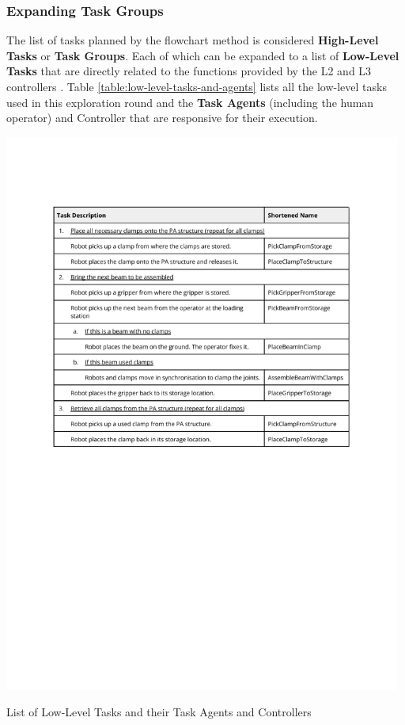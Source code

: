 \FloatBarrier

\subsubsection{Expanding Task Groups}
\label{subsubsection:exploration-3-expanding-task-groups}

The list of tasks planned by the flowchart method is considered \textbf{High-Level Tasks }or \textbf{Task Groups}. Each of which can be expanded to a list of \textbf{Low-Level Tasks} that are directly related to the functions provided by the L2 and L3 controllers . Table \ref{table:low-level-tasks-and-agents} lists all the low-level tasks used in this exploration round and the \textbf{Task Agents }(including the human operator) and Controller that are responsive for their execution.

\begin{table}[!h]
    \includegraphics[page=3, trim=25.4mm 160mm 25.4mm 33mm, clip, width=0.98\textwidth]{tables/Tables in Chapter 6.pdf}
    \caption{List of Low-Level Tasks and their Task Agents and Controllers}
    \label{table:low-level-tasks-and-agents}
\end{table}

